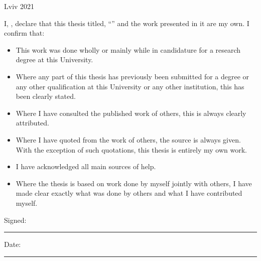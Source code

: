 \documentclass[
    11pt,
    english,
    singlespacing,
    headsepline,
    openany,
]{MastersThesis}
\begin{document}
\begin{titlepage}
\begin{center}
\vfill
{\large Lviv 2021}\\[4cm] %

\end{center}
\end{titlepage}


\begin{declaration}
\addchaptertocentry{\authorshipname} %
\noindent I, \authorname, declare that this thesis titled, \enquote{\ttitle} and the work presented in it are my own. I confirm that:

\begin{itemize} 
\item This work was done wholly or mainly while in candidature for a research degree at this University.
\item Where any part of this thesis has previously been submitted for a degree or any other qualification at this University or any other institution, this has been clearly stated.
\item Where I have consulted the published work of others, this is always clearly attributed.
\item Where I have quoted from the work of others, the source is always given. With the exception of such quotations, this thesis is entirely my own work.
\item I have acknowledged all main sources of help.
\item Where the thesis is based on work done by myself jointly with others, I have made clear exactly what was done by others and what I have contributed myself.\\
\end{itemize}
 
\noindent Signed:\\
\rule[0.5em]{25em}{0.5pt} %
 
\noindent Date:\\
\rule[0.5em]{25em}{0.5pt} %
\end{declaration}

\cleardoublepage

\end{document}
